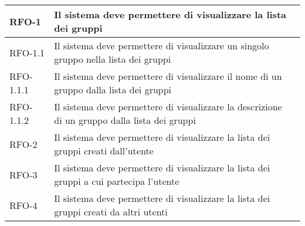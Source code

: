 \begin{center}
{\begin{longtable}{
      |>{\centering\arraybackslash}p{60pt}
      |>{\centering\arraybackslash}p{220pt}
      |>{\centering\arraybackslash}p{60pt}|}
      RFO-1                                                                & Il sistema deve permettere di visualizzare la lista dei
      gruppi                                                               & \nameref{uc:scenario-visualizzazione-lista-gruppi}            \\
      \hline
      RFO-1.1                                                              & Il sistema deve permettere di visualizzare un singolo
      gruppo nella lista dei gruppi                                        & \nameref{sub:visualizzazione-singolo-gruppo}                  \\
      \hline
      RFO-1.1.1                                                            & Il sistema deve permettere di visualizzare il nome di un
      gruppo dalla lista dei gruppi                                        & \nameref{subsub:visualizzazione-nome-gruppo}                  \\
      \hline
      RFO-1.1.2                                                            & Il sistema deve permettere di visualizzare la descrizione
      di un gruppo dalla lista dei gruppi                                  &
      \nameref{subsub:visualizzazione-descrizione-gruppo}                                                                                  \\
      \hline
      RFO-2                                                                & Il sistema deve permettere di visualizzare la lista dei
      gruppi creati dall'utente                                            &
      \nameref{uc:scenario-visualizzazione-lista-gruppi-creati}                                                                            \\
      \hline
      RFO-3                                                                & Il sistema deve permettere di visualizzare la lista dei
      gruppi	a cui partecipa l'utente                                       &
      \nameref{uc:scenario-visualizzazione-lista-gruppi-partecipa}                                                                         \\
      \hline
      RFO-4                                                                & Il sistema deve permettere di visualizzare la lista dei
      gruppi creati da altri utenti                                        &
      \nameref{uc:scenario-visualizzazione-lista-gruppi-altri}                                                                             \\
      \hline

\end{longtable}}
\end{center}
